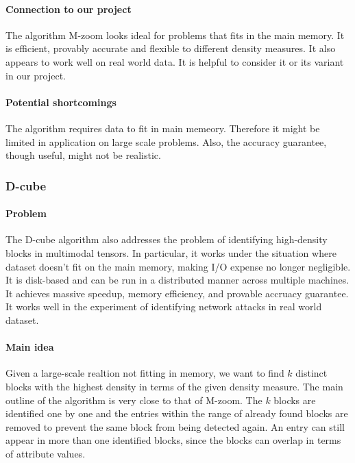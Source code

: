 \paragraph{Connection to our project} The algorithm M-zoom looks ideal for problems that fits in the main memory. It is efficient, provably accurate and flexible to different density measures. It also appears to work well on real world data. It is helpful to consider it or its variant in our project. 

\paragraph{Potential shortcomings} The algorithm requires data to fit in main memeory. Therefore it might be limited in application on large scale problems. Also, the accuracy guarantee, though useful, might not be realistic.


\subsubsection{D-cube \cite{shin2017d}}

\paragraph{Problem} The D-cube algorithm also addresses the problem of identifying high-density blocks in multimodal tensors. In particular, it works under the situation where dataset doesn't fit on the main memory, making I/O expense no longer negligible. It is disk-based and can be run in a distributed manner across multiple machines. It achieves massive speedup, memory efficiency, and provable accruacy guarantee. It works well in the experiment of identifying network attacks in real world dataset. 

\paragraph{Main idea} Given a large-scale realtion not fitting in memory, we want to find $k$ distinct blocks with the highest density in terms of the given density measure. The main outline of the algorithm is very close to that of M-zoom. The $k$ blocks are identified one by one and the entries within the range of already found blocks are removed to prevent the same block from being detected again. An entry can still appear in more than one identified blocks, since the blocks can overlap in terms of attribute values.

